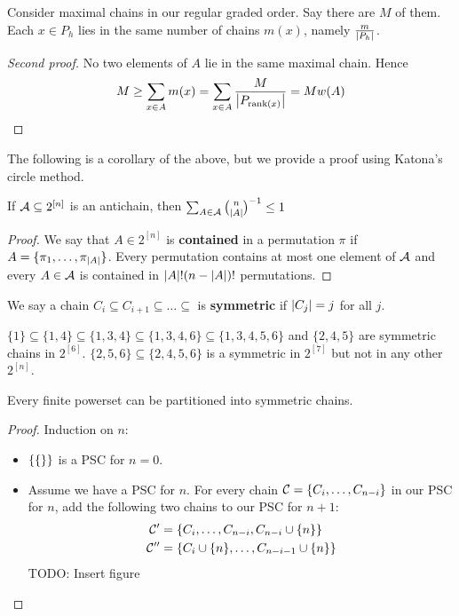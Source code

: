 \documentclass{article}
\begin{document}
\newlec

Consider maximal chains in our regular graded order. Say there are $M$ of them. Each $x \in P_h$ lies in the same number of chains $m(x)$, namely $\frac m{\left\lvert P_h\right\rvert}$.

\begin{proof}[Second proof]
  No two elements of $A$ lie in the same maximal chain. Hence
  $$M \ge \sum_{x \in A} m(x) = \sum_{x \in A} \frac M{\left\lvert P_{\operatorname{rank}(x)}\right\rvert} = Mw(A)$$
\end{proof}

The following is a corollary of the above, but we provide a proof using Katona's circle method.

\begin{nthm}
  If $\mathcal A \subseteq 2^{[n]}$ is an antichain, then $\sum_{A \in \mathcal A} {\binom n {\left\lvert A\right\rvert}}^{-1} \le 1$
\end{nthm}
\begin{proof}
  We say that $A \in 2^{[n]}$ is {\bf contained} in a permutation $\pi$ if $A = \{\pi_1, \dots, \pi_{\left\lvert A\right\rvert}\}$. Every permutation contains at most one element of $\mathcal A$ and every $A \in \mathcal A$ is contained in $\left\lvert A\right\rvert!(n - \left\lvert A\right\rvert)!$ permutations.
\end{proof}

We say a chain $C_i \subseteq C_{i + 1} \subseteq \dots \subseteq$ is {\bf symmetric} if $\left\lvert C_j\right\rvert = j$ for all $j$.

\begin{egs}
  $\{1\} \subseteq \{1, 4\} \subseteq \{1, 3, 4\} \subseteq \{1, 3, 4, 6\} \subseteq \{1, 3, 4, 5, 6\}$ and $\{2, 4, 5\}$ are symmetric chains in $2^{[6]}$. $\{2, 5, 6\} \subseteq \{2, 4, 5, 6\}$ is a symmetric in $2^{[7]}$ but not in any other $2^{[n]}$.
\end{egs}

\begin{nthm}
  Every finite powerset can be partitioned into symmetric chains.
\end{nthm}
\begin{proof}
  Induction on $n$:
  \begin{itemize}
    \item $\{\{\empty\}\}$ is a PSC for $n = 0$.
    \item Assume we have a PSC for $n$. For every chain $\mathcal C = \{C_i, \dots, C_{n - i}\}$ in our PSC for $n$, add the following two chains to our PSC for $n + 1$:
    \begin{align*}
      \mathcal C' & = \{C_i, \dots, C_{n - i}, C_{n - i} \cup \{n\}\} \\
      \mathcal C'' & = \{C_i \cup \{n\}, \dots, C_{n - i - 1} \cup \{n\}\}
    \end{align*}
    TODO: Insert figure
  \end{itemize}
\end{proof}
\end{document}
